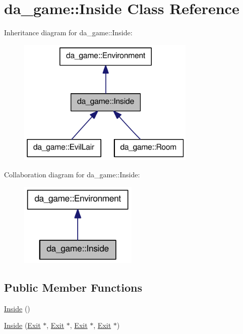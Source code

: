 \hypertarget{classda__game_1_1Inside}{
\section{da\_\-game::Inside Class Reference}
\label{classda__game_1_1Inside}
}
Inheritance diagram for da\_\-game::Inside:\nopagebreak
\begin{figure}[H]
\begin{center}
\leavevmode
\includegraphics[width=240pt]{classda__game_1_1Inside__inherit__graph}
\end{center}
\end{figure}
Collaboration diagram for da\_\-game::Inside:\nopagebreak
\begin{figure}[H]
\begin{center}
\leavevmode
\includegraphics[width=160pt]{classda__game_1_1Inside__coll__graph}
\end{center}
\end{figure}
\subsection*{Public Member Functions}
\begin{DoxyCompactItemize}
\item 
\hyperlink{classda__game_1_1Inside_a90752ab2ce2d5991185aba47e962befd}{Inside} ()
\item 
\hyperlink{classda__game_1_1Inside_aa36eb3ecd2ad203540866314d5392078}{Inside} (\hyperlink{classda__game_1_1Exit}{Exit} $\ast$, \hyperlink{classda__game_1_1Exit}{Exit} $\ast$, \hyperlink{classda__game_1_1Exit}{Exit} $\ast$, \hyperlink{classda__game_1_1Exit}{Exit} $\ast$)
\end{DoxyCompactItemize}


